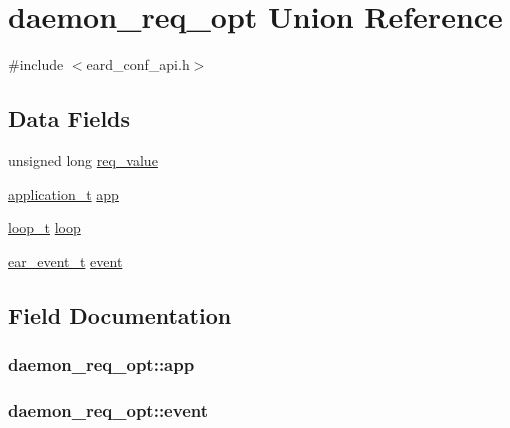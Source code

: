 \hypertarget{uniondaemon__req__opt}{}\section{daemon\+\_\+req\+\_\+opt Union Reference}
\label{uniondaemon__req__opt}


{\ttfamily \#include $<$eard\+\_\+conf\+\_\+api.\+h$>$}

\subsection*{Data Fields}
\begin{DoxyCompactItemize}
\item 
unsigned long \hyperlink{uniondaemon__req__opt_a0f428451371a39762fc8b51d8b010f84}{req\+\_\+value}
\item 
\hyperlink{application_8h_af0a524c43fc5f548021099181df194bf}{application\+\_\+t} \hyperlink{uniondaemon__req__opt_ac25c4d8f45f1807727ce782644c8c94a}{app}
\item 
\hyperlink{loop_8h_a3cab4c06c8bb84fe949df61aa5ca8d5b}{loop\+\_\+t} \hyperlink{uniondaemon__req__opt_a44456b549010fac1132f44152d46027a}{loop}
\item 
\hyperlink{log_8h_a17129a55b5f8d7f3d58fab213ad96cac}{ear\+\_\+event\+\_\+t} \hyperlink{uniondaemon__req__opt_ac39ddc118b588677124515bd93cbc950}{event}
\end{DoxyCompactItemize}


\subsection{Field Documentation}
\subsubsection[{\texorpdfstring{app}{app}}]{ daemon\+\_\+req\+\_\+opt\+::app}\hypertarget{uniondaemon__req__opt_ac25c4d8f45f1807727ce782644c8c94a}{}\label{uniondaemon__req__opt_ac25c4d8f45f1807727ce782644c8c94a}
\subsubsection[{\texorpdfstring{event}{event}}]{ daemon\+\_\+req\+\_\+opt\+::event}\hypertarget{uniondaemon__req__opt_ac39ddc118b588677124515bd93cbc950}{}\label{uniondaemon__req__opt_ac39ddc118b588677124515bd93cbc950}
